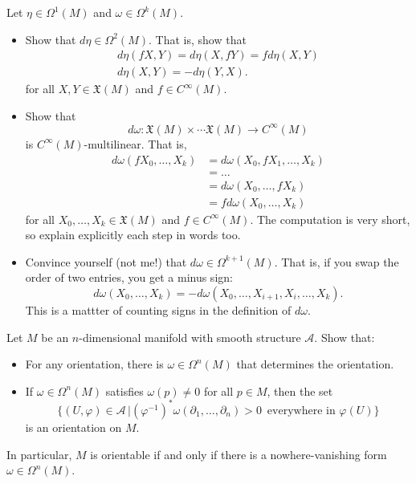 \documentclass{ximera}
\begin{document}
\begin{exercise}
     Let $\eta \in \Omega ^1 (M) $ and $\omega \in \Omega ^k (M)$. 
    \begin{itemize}
        \item  Show that $d\eta \in \Omega ^2 (M)$. That is, show that 
        \begin{gather*}
              d\eta(fX , Y ) = d\eta (X, fY) = f d\eta(X, Y )   \\
                d \eta (X,Y) = - d \eta (Y,X) .     
        \end{gather*}
        for all $X,Y \in \mathfrak{X}(M)$ and $f \in C^{\infty}(M)$. 
        \item Show that 
        \[ d \omega : \mathfrak{X}(M) \times \cdots \mathfrak{X}(M) \to C^{\infty} (M)  \]  
        is $C^{\infty}(M)$-multilinear. That is, 
        \begin{align*}
               d\omega (fX_0, \ldots , X_k) & = d\omega (X_0, fX_1, \ldots , X_k) \\ 
               & = \ldots \\
               & = d\omega (X_0, \ldots , fX_k)  \\ 
               & = f d\omega (X_0 ,\ldots , X_k)          
        \end{align*}
        for all $X_0, \ldots , X_k \in \mathfrak{X}(M) $ and $f \in C^{\infty} (M)$. The computation is very short, so explain explicitly each step in words too. 
        \item Convince yourself (not me!) that $d\omega \in \Omega ^{k+1}(M)$. That is, if you swap the order of two entries, you get a minus sign:
        \[    d \omega (X_0, \ldots , X_k) = - d\omega (X_0 , \ldots , X_{i+1}, X_i , \ldots , X_k).                        \]
        This is a mattter of counting signs in the definition of $d \omega $. 
    \end{itemize}
 
\end{exercise}


\begin{exercise}
    
      Let $M$ be an $n$-dimensional manifold with smooth structure $\mathcal{A}$. Show that:
        \begin{itemize}
            \item For any orientation, there is $\omega \in \Omega ^n (M)$ that determines the orientation.
            \item If $\omega \in \Omega ^n (M)$ satisfies $\omega (p) \neq 0$ for all $p \in M$, then the set 
            \[   \{   (U , \varphi )   \in \mathcal{A}  \, \vert  (\varphi ^{-1} )^{\ast} \omega (\partial _1  , \ldots , \partial _n ) > 0  \, \text{ everywhere in } \varphi (U) \}                \]
            is an orientation on $M$.
        \end{itemize}
        In particular, $M$ is orientable if and only if there is a nowhere-vanishing form $\omega \in \Omega ^n (M)$.

\end{exercise}
\end{document}
